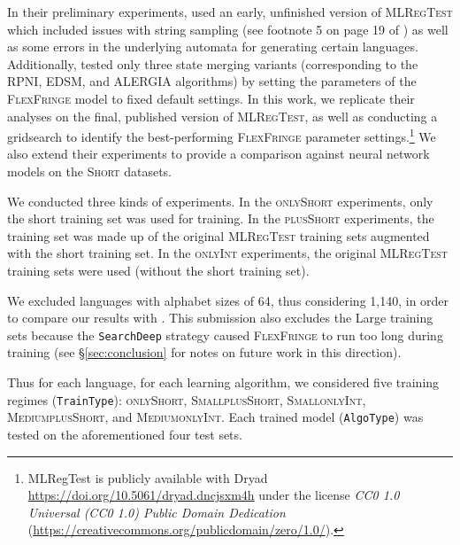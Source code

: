 \documentclass[twoside,11pt]{article}
\newcommand{\tscx}[1]{\textsc{#1}\xspace}
\newcommand{\ttt}[1]{\texttt{#1}}
\newcommand{\tttx}[1]{\ttt{#1}\xspace}
\newcommand{\TrainSize}{\tttx{TrainType}}
\newcommand{\AlgoType}{\tttx{AlgoType}}
\newcommand{\sm}{\tscx{Small}}
\newcommand{\med}{\tscx{Medium}}
\newcommand{\short}{\tscx{Short}}
\newcommand{\onlyShort}{\tscx{onlyShort}}
\newcommand{\plusShort}{\tscx{plusShort}}
\newcommand{\onlyInt}{\tscx{onlyInt}}
\begin{document}
In their preliminary experiments, \citeauthor{adil23} used an early, unfinished version of \textsc{MLRegTest} which included issues with string sampling (see footnote 5 on page 19 of \citet{mlregtest}) as well as some errors in the underlying automata for generating certain languages.
Additionally, \citeauthor{adil23} tested only three state merging variants (corresponding to the RPNI, EDSM, and ALERGIA algorithms) by setting the parameters of the \textsc{FlexFringe} model to fixed default settings.
In this work, we replicate their analyses on the final, published version of \textsc{MLRegTest},
as well as conducting a gridsearch to identify the best-performing \textsc{FlexFringe} parameter settings.\footnote{MLRegTest is publicly available with Dryad \url{https://doi.org/10.5061/dryad.dncjsxm4h} under the license \emph{CC0 1.0 Universal (CC0 1.0) Public Domain Dedication} (\url{https://creativecommons.org/publicdomain/zero/1.0/}).}  
We also extend their experiments to provide a comparison against neural network models on the \short datasets.

We conducted three kinds of experiments. 
In the \onlyShort experiments, only the short training set was used for training. 
In the \plusShort experiments, the training set was made up of the original \textsc{MLRegTest} training sets augmented with the short
training set. 
In the \onlyInt experiments, the original \textsc{MLRegTest} training sets were used (without the short training set).

We excluded languages with alphabet sizes of 64, thus considering
1,140, in order to compare our results with \citet{adil23}. 
This submission also excludes the Large training sets because the
\texttt{SearchDeep} strategy caused \textsc{FlexFringe} to run too long during
training (see \S\ref{sec:conclusion} for notes on future work in this direction).

Thus for each language, for each learning algorithm, we considered five
training regimes (\TrainSize): \onlyShort, \sm \plusShort, \sm \onlyInt, \med \plusShort, and \med \onlyInt.
Each trained model (\AlgoType) was tested on
the aforementioned four test sets.
  
\end{document}
